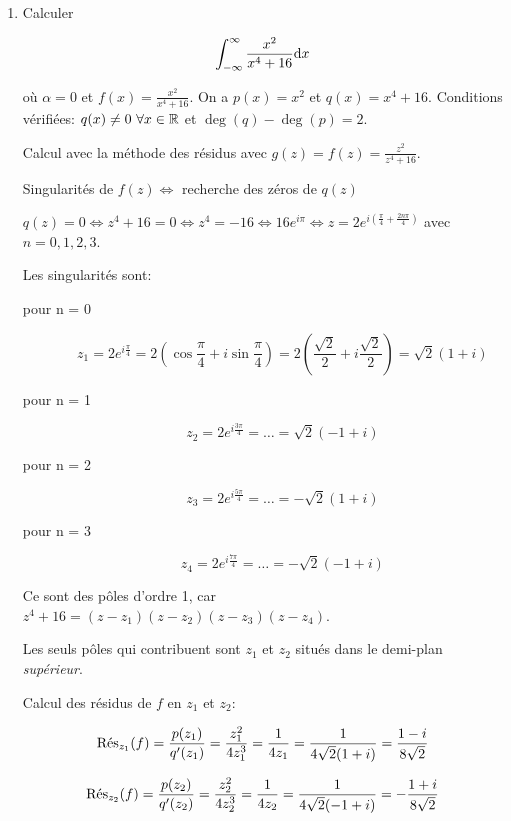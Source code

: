 \begin{enumerate}
\item

\begin{example}[1]
Calculer

\[ \int_{-\infty}^\infty \frac{x^2}{x^4 + 16} \dx \]

où $\alpha = 0$ et $f(x) = \frac{x^2}{x^4 + 16}$.
On a $p(x) = x^2$ et $q(x) = x^4 + 16$.
Conditions vérifiées: $q(x) \neq 0 \ \forall x \in \R$ et $\deg(q) - \deg(p) = 2$.

Calcul avec la méthode des résidus avec $g(z) = f(z) = \frac{z^2}{z^4 + 16}$.

Singularités de $f(z) \iff$ recherche des zéros de $q(z)$

$q(z) = 0 \iff z^4 + 16 = 0 \iff z^4 = -16 \iff 16 e^{i\pi} \iff z = 2 e^{i\left(\frac{\pi}{4} + \frac{2n\pi}{4}\right)}$ avec $n = 0,1,2,3$.

Les singularités sont:

\begin{description}
    \item[pour n = 0]
        \[ z_1 = 2 e^{i\frac{\pi}{4}}
        = 2 \left( \cos \frac{\pi}{4} + i \sin \frac{\pi}{4}\right)
        = 2 \left( \frac{\sqrt{2}}{2} + i \frac{\sqrt{2}}{2} \right) = \sqrt{2} (1 + i)\]

    \item[pour n = 1]
        \[ z_2 = 2 e^{i\frac{3\pi}{4}} = \ldots = \sqrt{2} (-1 + i) \]

    \item[pour n = 2]
        \[ z_3 = 2 e^{i\frac{5\pi}{4}} = \ldots = - \sqrt{2} (1 + i) \]

    \item[pour n = 3]
        \[ z_4 = 2 e^{i\frac{7\pi}{4}} = \ldots = - \sqrt{2} (-1 + i) \]
\end{description}

Ce sont des pôles d'ordre 1, car $z^4 + 16 = (z - z_1) (z - z_2) (z - z_3) (z - z_4)$.

Les seuls pôles qui contribuent sont $z_1$ et $z_2$ situés dans le demi-plan \textit{supérieur}.

Calcul des résidus de $f$ en $z_1$ et $z_2$:

\[
    \Res_{z_1}(f) = \frac{p(z_1)}{q'(z_1)}
    = \frac{z_1^2}{4 z_1^3} = \frac{1}{4 z_1} = \frac{1}{4\sqrt{2}(1+i)} = \frac{1 - i}{8\sqrt{2}}
\]

\[
    \Res_{z_2}(f) = \frac{p(z_2)}{q'(z_2)}
    = \frac{z_2^2}{4 z_2^3} = \frac{1}{4 z_2} = \frac{1}{4\sqrt{2}(-1+i)} = - \frac{1 + i}{8\sqrt{2}}
\]


\end{example}
\end{enumerate}
